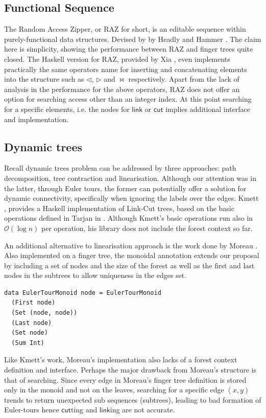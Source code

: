 \documentclass{elsarticle}
\newcommand{\MATHSF}[1]{\ensuremath{\mathsf{#1}}\xspace}
\newcommand{\link}{\MATHSF{link}}
\newcommand{\cut}{\MATHSF{cut}}
\renewcommand{\O}{\ensuremath{\mathcal{O}}}
\begin{document}
\subsection{Functional Sequence}
The Random Access Zipper, or RAZ for short, is an editable sequence within purely-functional data structures. Devised by by Headly and Hammer \cite{RAZ}. The claim here is simplicity, showing the performance between RAZ and finger trees quite closed. The Haskell version for RAZ, provided by Xia \cite{HaskellRAZ}, even implements practically the same operators name for inserting and concatenating elements into the structure such as $\lhd$, $\rhd$ and $\bowtie$ respectively. Apart from the lack of analysis in the performance for the above operators, RAZ does not offer an option for searching access other than an integer index. At this point searching for a specific elements, i.e. the nodes for \link or \cut implies additional interface and implementation.

\subsection{Dynamic trees}

Recall dynamic trees problem can be addressed by three approaches: path decomposition, tree contraction and linearisation. Although our attention was in the latter, through Euler tours, the former can potentially offer a solution for dynamic connectivity, specifically when ignoring the labels over the edges. Kmett \cite{HaskellLC}, provides a Haskell implementation of Link-Cut trees, based on the basic operations defined in Tarjan in \cite{LittleBook}. Although Kmett's basic operations run also in $\O(\log n)$ per operation, his library does not include the forest context so far. 

An additional alternative to linearisation approach is the work done by Moreau \cite{HaskellET}. Also implemented on a finger tree, the monoidal annotation extends our proposal by including a set of nodes and the size of the forest as well as the first and last nodes in the subtrees to allow uniqueness in the edges set.
\begin{lstlisting}[mathescape]
data EulerTourMonoid node = EulerTourMonoid
  (First node)
  (Set (node, node))
  (Last node)
  (Set node)
  (Sum Int)
\end{lstlisting} 

Like Kmett's work, Moreau's implementation also lacks of a forest context definition and interface. Perhaps the major  drawback from Moreau's structure is that of searching. Since every edge in Moreau's finger tree definition is stored only in the monoid and not on the leaves, searching for a specific edge $(x,y)$ trends to return unexpected sub sequences (subtrees), leading to bad formation of Euler-tours hence {\cut}ting and {\link}ing are not accurate.
\end{document}
